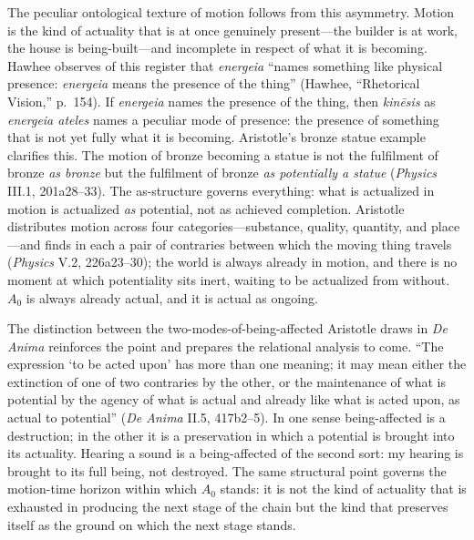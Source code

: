 The peculiar ontological texture of motion follows from this asymmetry. Motion is the kind of actuality that is at once genuinely present---the builder is at work, the house is being-built---and incomplete in respect of what it is becoming. Hawhee observes of this register that \textit{energeia} ``names something like physical presence: \textit{energeia} means the presence of the thing'' (Hawhee, ``Rhetorical Vision,'' p.~154). If \textit{energeia} names the presence of the thing, then \textit{kinēsis} as \textit{energeia ateles} names a peculiar mode of presence: the presence of something that is not yet fully what it is becoming. Aristotle's bronze statue example clarifies this. The motion of bronze becoming a statue is not the fulfilment of bronze \textit{as bronze} but the fulfilment of bronze \textit{as potentially a statue} (\textit{Physics} III.1, 201a28--33). The as-structure governs everything: what is actualized in motion is actualized \textit{as} potential, not as achieved completion. Aristotle distributes motion across four categories---substance, quality, quantity, and place---and finds in each a pair of contraries between which the moving thing travels (\textit{Physics} V.2, 226a23--30); the world is always already in motion, and there is no moment at which potentiality sits inert, waiting to be actualized from without. $A_0$ is always already actual, and it is actual as ongoing.

The distinction between the two-modes-of-being-affected Aristotle draws in \textit{De Anima} reinforces the point and prepares the relational analysis to come. ``The expression `to be acted upon' has more than one meaning; it may mean either the extinction of one of two contraries by the other, or the maintenance of what is potential by the agency of what is actual and already like what is acted upon, as actual to potential'' (\textit{De Anima} II.5, 417b2--5). In one sense being-affected is a destruction; in the other it is a preservation in which a potential is brought into its actuality. Hearing a sound is a being-affected of the second sort: my hearing is brought to its full being, not destroyed. The same structural point governs the motion-time horizon within which $A_0$ stands: it is not the kind of actuality that is exhausted in producing the next stage of the chain but the kind that preserves itself as the ground on which the next stage stands.

